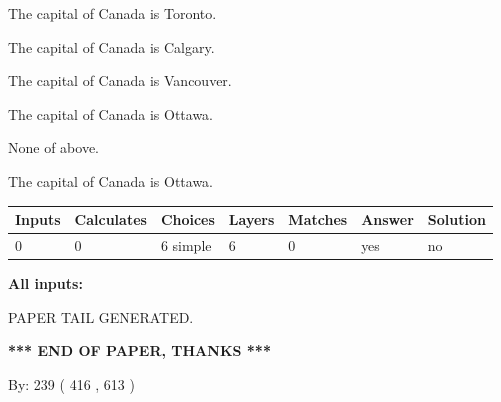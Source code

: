 \documentclass[12pt]{article}
\begin{document}
 
The capital of Canada is Toronto.
 
 
The capital of Canada is Calgary.
 
 
The capital of Canada is Vancouver.
 
 
The capital of Canada is Ottawa.
 
 
 None of above.
 
 
\noindent{}
 
 
The capital of Canada is Ottawa.
 
 
\noindent{}
 
 
   
   
   
   
\noindent\begin{tabular}{|l|l|l|l|l|l|l|}
 \hline
Inputs & Calculates & Choices & Layers & Matches & Answer & Solution \\ \hline
 0  & 
 0  & 
 6
  simple  
  & 
 6  & 
 0  & 
  yes & 
  no 
  \\ \hline
 \end{tabular}
   
   
   
   
\noindent{}
   
   
   
   
\noindent\vspace{0.1in}\hspace{-0.08in} {\textbf{\Large{All inputs: }}}
   
   
   
   
   
   
 \vspace{0.2in}
 
   
   
\vspace{2.0in} PAPER TAIL GENERATED.
   
   
   
   
\vspace{1.0in} 
{\textbf{\large{ *** END OF PAPER, THANKS *** }}} 
   
   
\hspace{1.0in} By: 
 239 ( 416 ,  613 )
   
\end{document}
